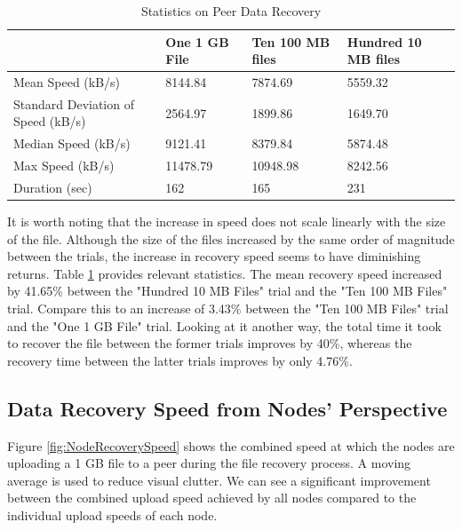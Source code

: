 \documentclass[12pt]{report}
\begin{document}
\begin{table}
\begin{adjustwidth}{-.5in}{-.5in}
\centering
    \begin{tabular}{| l | l | l | l |}
    \hline
    & One 1 GB File & Ten 100 MB files & Hundred 10 MB files \\ \hline
    Mean Speed (kB/s)& 8144.84 & 7874.69 & 5559.32 \\ \hline
    Standard Deviation of Speed (kB/s) & 2564.97 & 1899.86 & 1649.70 \\ \hline
    Median Speed (kB/s)& 9121.41 & 8379.84 & 5874.48 \\ \hline
    Max Speed (kB/s) & 11478.79 & 10948.98 & 8242.56 \\ \hline
    Duration (sec) & 162 & 165 & 231 \\ \hline
    \end{tabular}
    \caption{Statistics on Peer Data Recovery}
    \label{tab:PeerRecoverySpeed}
\end{adjustwidth}
\end{table}

It is worth noting that the increase in speed does not scale linearly with the size of the file. Although the size of the files increased by the same order of magnitude between the trials, the increase in recovery speed seems to have diminishing returns. Table \ref{tab:PeerRecoverySpeed} provides relevant statistics. The mean recovery speed increased by 41.65\% between the "Hundred 10 MB Files" trial and the "Ten 100 MB Files" trial. Compare this to an increase of 3.43\% between the "Ten 100 MB Files" trial and the "One 1 GB File" trial. Looking at it another way, the total time it took to recover the file between the former trials improves by 40\%, whereas the recovery time between the latter trials improves by only 4.76\%.

\subsection{Data Recovery Speed from Nodes' Perspective} \label{subsec:DataRecoverySpeedfromNodesPerspective}

Figure \ref{fig:NodeRecoverySpeed} shows the combined speed at which the nodes are uploading a 1 GB file to a peer during the file recovery process. A moving average is used to reduce visual clutter. We can see a significant improvement between the combined upload speed achieved by all nodes compared to the individual upload speeds of each node.
\end{document}
